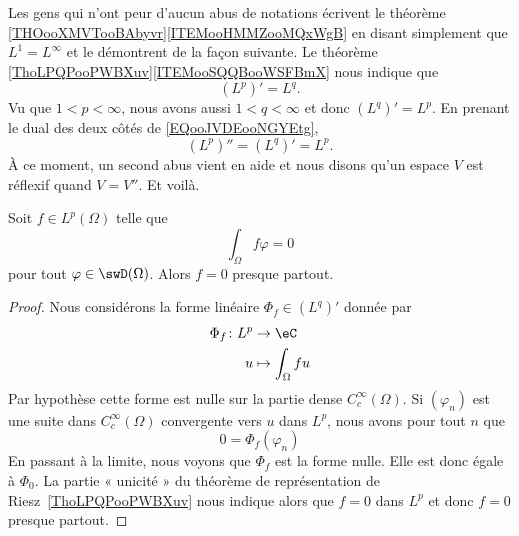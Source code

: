 \begin{normaltext}
	Les gens qui n'ont peur d'aucun abus de notations écrivent le théorème \ref{THOooXMVTooBAbyvr}\ref{ITEMooHMMZooMQxWgB} en disant simplement que \( L^1=L^{\infty}\) et le démontrent de la façon suivante. Le théorème \ref{ThoLPQPooPWBXuv}\ref{ITEMooSQQBooWSFBmX} nous indique que
	\begin{equation}        \label{EQooJVDEooNGYEtg}
		(L^p)'=L^q.
	\end{equation}
	Vu que \( 1<p<\infty\), nous avons aussi \( 1<q<\infty\) et donc \( (L^q)'=L^p\). En prenant le dual des deux côtés de \eqref{EQooJVDEooNGYEtg},
	\begin{equation}
		(L^p)''=(L^q)'=L^p.
	\end{equation}
	À ce moment, un second abus vient en aide et nous disons qu'un espace \( V\) est réflexif quand \( V=V''\). Et voilà.
\end{normaltext}


\begin{proposition} \label{PropUKLZZZh}
	Soit \( f\in L^p(\Omega)\) telle que
	\begin{equation}
		\int_{\Omega}f\varphi=0
	\end{equation}
	pour tout \( \varphi\in \swD(\Omega)\). Alors \( f=0\) presque partout.
\end{proposition}

\begin{proof}
	Nous considérons la forme linéaire \( \Phi_f\in (L^q)'\) donnée par
	\begin{equation}
		\begin{aligned}
			\Phi_f\colon L^p & \to \eC                 \\
			u                & \mapsto \int_{\Omega}fu
		\end{aligned}
	\end{equation}
	Par hypothèse cette forme est nulle sur la partie dense \(  C^{\infty}_c(\Omega)\). Si \( (\varphi_n)\) est une suite dans \(  C^{\infty}_c(\Omega)\) convergente vers \( u\) dans \( L^p\), nous avons pour tout \( n\) que
	\begin{equation}
		0=\Phi_f(\varphi_n)
	\end{equation}
	En passant à la limite, nous voyons que \( \Phi_f\) est la forme nulle. Elle est donc égale à \( \Phi_0\). La partie « unicité » du théorème de représentation de Riesz~\ref{ThoLPQPooPWBXuv} nous indique alors que \( f=0\) dans \( L^p\) et donc \( f=0\) presque partout.
\end{proof}


